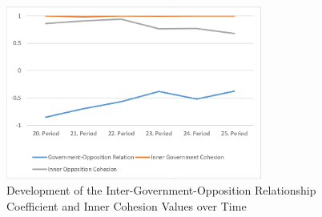 \begin{figure}
\center
	\includegraphics[width=0.75\textwidth]{imgs/gov_opp_rel_graph}
	\caption{Development of the Inter-Government-Opposition Relationship Coefficient and Inner Cohesion Values over Time}
	\label{fig:gov_opp_relation}
\end{figure}